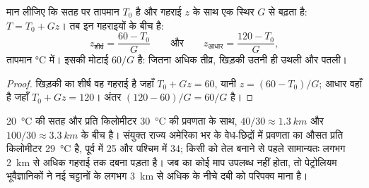 \begin{proposition}[तेल-खिड़की की गहराई]\label{prop:g11:fossil-fuel-geology:window-depth}
मान लीजिए कि सतह पर तापमान $T_0$ है और गहराई $z$ के साथ एक
स्थिर  $G$ से बढ़ता है: $T = T_0 + G z$। तब 
इन गहराइयों के बीच है:
\[
  z_{\text{शीर्ष}} = \frac{60 - T_0}{G}
  \qquad\text{और}\qquad
  z_{\text{आधार}} = \frac{120 - T_0}{G},
\]
तापमान \unit{\degreeCelsius} में। इसकी मोटाई $60/G$ है: 
जितना अधिक तीव्र, खिड़की उतनी ही उथली और पतली।
\end{proposition}

\begin{proof}
खिड़की का शीर्ष वह गहराई है जहाँ $T_0 + G z = 60$, यानी
$z = (60 - T_0)/G$; आधार वहाँ है जहाँ $T_0 + G z = 120$। अंतर
$(120 - 60)/G = 60/G$ है।
\end{proof}

\qty{20}{\degreeCelsius} की सतह और प्रति किलोमीटर
\qty{30}{\degreeCelsius} की प्रवणता के साथ, 
$40/30 \approx \qty{1.3}{km}$ और $100/30 \approx \qty{3.3}{km}$ के बीच है। संयुक्त राज्य अमेरिका भर के
वेध-छिद्रों में प्रवणता का औसत प्रति किलोमीटर
\qty{29}{\degreeCelsius} है, पूर्व में \num{25} और पश्चिम में \num{34};
किसी  को तेल बनाने से पहले सामान्यतः लगभग
\qty{2}{km} से अधिक गहराई तक दबना पड़ता है। जब  का कोई माप
उपलब्ध नहीं होता, तो पेट्रोलियम भूवैज्ञानिकों ने नई चट्टानों के लगभग \qty{3}{km} से अधिक के
नीचे दबी  को परिपक्व माना है।

